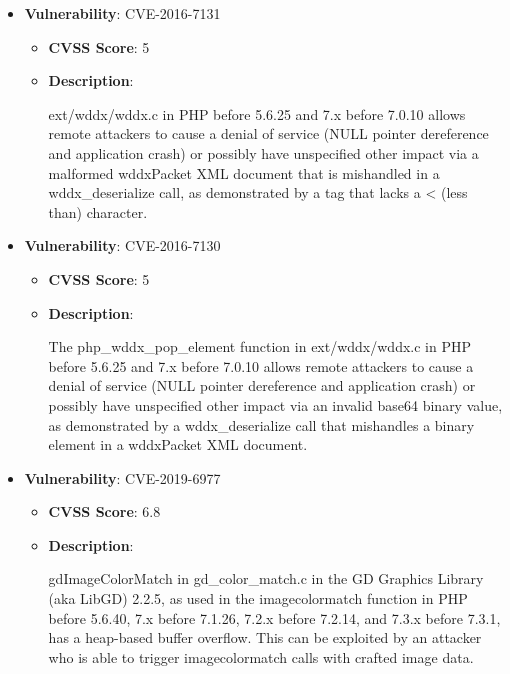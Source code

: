 \documentclass{article}
\begin{document}
\begin{itemize}
        \item \textbf{Vulnerability}: CVE-2016-7131
        \begin{itemize}
            \item \textbf{CVSS Score}:  5 
            \item \textbf{Description}:
            \parbox[t]{0.9\linewidth}{
                \ttfamily ext/wddx/wddx.c in PHP before 5.6.25 and 7.x before 7.0.10 allows remote attackers to cause a denial of service (NULL pointer dereference and application crash) or possibly have unspecified other impact via a malformed wddxPacket XML document that is mishandled in a wddx\_deserialize call, as demonstrated by a tag that lacks a < (less than) character.
            }
        \end{itemize}
    
        \item \textbf{Vulnerability}: CVE-2016-7130
        \begin{itemize}
            \item \textbf{CVSS Score}:  5 
            \item \textbf{Description}:
            \parbox[t]{0.9\linewidth}{
                \ttfamily The php\_wddx\_pop\_element function in ext/wddx/wddx.c in PHP before 5.6.25 and 7.x before 7.0.10 allows remote attackers to cause a denial of service (NULL pointer dereference and application crash) or possibly have unspecified other impact via an invalid base64 binary value, as demonstrated by a wddx\_deserialize call that mishandles a binary element in a wddxPacket XML document.
            }
        \end{itemize}
    
        \item \textbf{Vulnerability}: CVE-2019-6977
        \begin{itemize}
            \item \textbf{CVSS Score}:  6.8 
            \item \textbf{Description}:
            \parbox[t]{0.9\linewidth}{
                \ttfamily gdImageColorMatch in gd\_color\_match.c in the GD Graphics Library (aka LibGD) 2.2.5, as used in the imagecolormatch function in PHP before 5.6.40, 7.x before 7.1.26, 7.2.x before 7.2.14, and 7.3.x before 7.3.1, has a heap-based buffer overflow. This can be exploited by an attacker who is able to trigger imagecolormatch calls with crafted image data.
            }
        \end{itemize}
    

\end{itemize}
\end{document}
